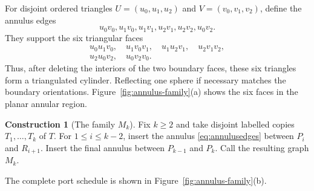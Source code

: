 \documentclass[11pt]{article}
\theoremstyle{definition}
\newtheorem{construction}[theorem]{Construction}
\theoremstyle{remark}
\begin{document}
For disjoint ordered triangles
$U=(u_0,u_1,u_2)$ and $V=(v_0,v_1,v_2)$, define the annulus edges
\begin{equation}\label{eq:annulusedges}
 u_0v_0,
 u_1v_0,
 u_1v_1,
 u_2v_1,
 u_2v_2,
 u_0v_2.
\end{equation}
They support the six triangular faces
\begin{equation}\label{eq:annulusfaces}
\begin{gathered}
 u_0u_1v_0,
 \quad u_1v_0v_1,
 \quad u_1u_2v_1,
 \quad u_2v_1v_2,\\
 u_2u_0v_2,
 \quad u_0v_2v_0.
\end{gathered}
\end{equation}
Thus, after deleting the interiors of the two boundary faces, these six
triangles form a triangulated cylinder.  Reflecting one sphere if necessary
matches the boundary orientations.  Figure~\ref{fig:annulus-family}(a) shows
the six faces in the planar annular region.

\begin{construction}[The family $M_k$]\label{con:family}
Fix $k\ge2$ and take disjoint labelled copies $T_1,\ldots,T_k$ of $T$.
For $1\le i\le k-2$, insert the annulus
\eqref{eq:annulusedges} between $P_i$ and $R_{i+1}$.  Insert the final
annulus between $P_{k-1}$ and $P_k$.  Call the resulting graph $M_k$.
\end{construction}

The complete port schedule is shown in Figure~\ref{fig:annulus-family}(b).
\end{document}
